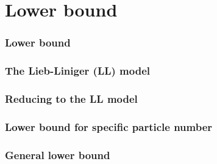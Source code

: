 \documentclass{beamer}[10]
\begin{document}
\section{Lower bound}

\begin{frame}
	\frametitle{Lower bound}
	\begin{block}{}
		
	\end{block}	
\end{frame}

\begin{frame}
	\frametitle{The Lieb-Liniger (LL) model}
	\begin{block}{}
		
	\end{block}	
\end{frame}

\begin{frame}
	\frametitle{Reducing to the LL model}
	\begin{block}{}
		
	\end{block}	
\end{frame}

\begin{frame}
	\frametitle{Lower bound for specific particle number}
	\begin{block}{}
		
	\end{block}	
\end{frame}

\begin{frame}
	\frametitle{General lower bound}
	\begin{block}{}
		
	\end{block}	
\end{frame}
\end{document}
